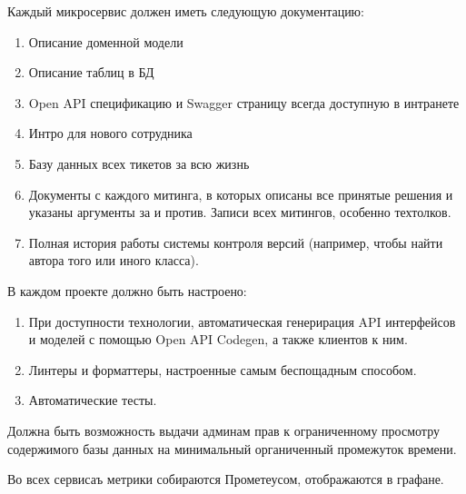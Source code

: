 
Каждый микросервис должен иметь следующую документацию:
\begin{enumerate}
    \item Описание доменной модели
    \item Описание таблиц в БД
    \item Open API спецификацию и Swagger страницу 
          всегда доступную в интранете
    \item Интро для нового сотрудника
    \item Базу данных всех тикетов за всю жизнь
    \item Документы с каждого митинга, в которых описаны 
          все принятые решения и указаны аргументы 
          за и против. Записи всех митингов, особенно 
          техтолков.
    \item Полная история работы системы контроля версий
          (например, чтобы найти автора того или иного класса).
\end{enumerate}

В каждом проекте должно быть настроено:
\begin{enumerate}
    \item При доступности технологии, автоматическая 
          генерирация API интерфейсов и моделей с помощью
          Open API Codegen, а также клиентов к ним.
    \item Линтеры и форматтеры, настроенные самым беспощадным способом.
    \item Автоматические тесты.
\end{enumerate}

Должна быть возможность выдачи админам прав к ограниченному 
просмотру содержимого базы данных на минимальный органиченный 
промежуток времени.

Во всех сервисаъ метрики собираются Прометеусом, 
отображаются в графане.

